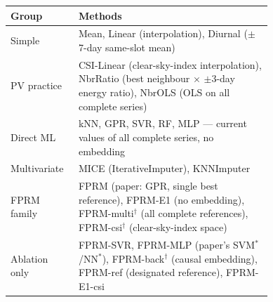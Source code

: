 \begin{tabular}{lp{0.74\linewidth}}
\toprule
Group & Methods \\
\midrule
Simple & Mean, Linear (interpolation), Diurnal ($\pm$7-day same-slot mean) \\
PV practice & CSI-Linear (clear-sky-index interpolation), NbrRatio (best neighbour $\times$ $\pm$3-day energy ratio), NbrOLS (OLS on all complete series) \\
Direct ML & kNN, GPR, SVR, RF, MLP --- current values of all complete series, no embedding \\
Multivariate & MICE (IterativeImputer), KNNImputer \\
FPRM family & FPRM (paper: GPR, single best reference), FPRM-E1 (no embedding), FPRM-multi$^\dagger$ (all complete references), FPRM-csi$^\dagger$ (clear-sky-index space) \\
Ablation only & FPRM-SVR, FPRM-MLP (paper's SVM$^*$/NN$^*$), FPRM-back$^\dagger$ (causal embedding), FPRM-ref (designated reference), FPRM-E1-csi \\
\bottomrule
\end{tabular}
